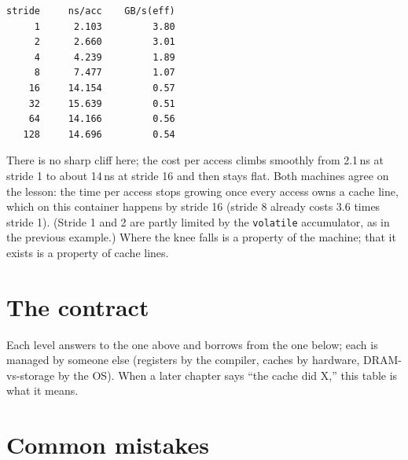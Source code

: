 \begin{example}
\begin{lstlisting}[language={},label={lst:stridelinux09},caption={Linux x86\_64 container,
\texttt{./ch09\_stride\_bw}: 64\,MiB array, 8-byte elements, 20 sweeps
per stride. Captured in \texttt{code/ch09\_stride\_linux.txt}.}]
stride     ns/acc    GB/s(eff)
     1      2.103         3.80
     2      2.660         3.01
     4      4.239         1.89
     8      7.477         1.07
    16     14.154         0.57
    32     15.639         0.51
    64     14.166         0.56
   128     14.696         0.54
\end{lstlisting}
There is no sharp cliff here; the cost per access climbs smoothly from
2.1\,ns at stride 1 to about 14\,ns at stride 16 and then stays flat.
Both machines agree on the lesson: the time per access stops growing
once every access owns a cache line, which on this container happens
by stride 16 (stride 8 already costs 3.6 times stride 1). (Stride 1
and 2 are partly limited by the \texttt{volatile} accumulator, as in the
previous example.) Where the knee falls is a property of the machine;
that it exists is a property of cache lines.
\end{example}



\section{The contract}
\label{sec:contract09}



Each level answers to the one above and borrows from the one below;
each is managed by someone else (registers by the compiler, caches
by hardware, DRAM-vs-storage by the OS). When a later chapter says
``the cache did X,'' this table is what it means.

\section{Common mistakes}
\label{sec:mistakes09}


